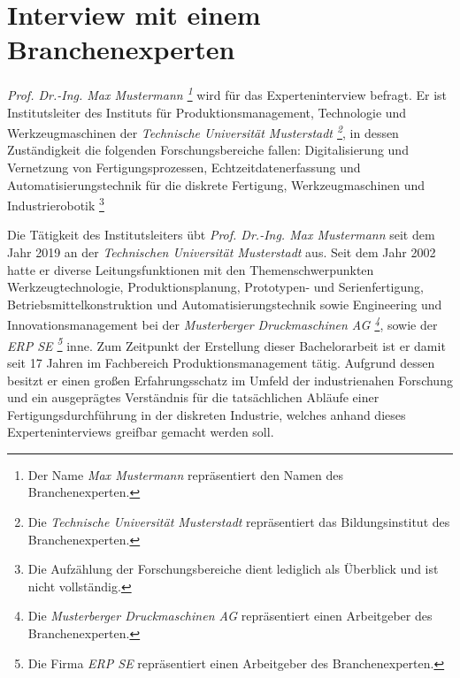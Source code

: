 \tocless\section{Interview mit einem Branchenexperten}\label{ah:interviewTUD}

\textit{Prof. Dr.-Ing. Max Mustermann \footnote{Der Name \textit{Max Mustermann} repräsentiert den Namen des Branchenexperten.}} wird für das Experteninterview befragt.
Er ist Institutsleiter des Instituts für Produktionsmanagement, Technologie und Werkzeugmaschinen der \textit{Technische Universität Musterstadt \footnote{Die \textit{Technische Universität Musterstadt} repräsentiert das Bildungsinstitut des Branchenexperten.}}, in dessen Zuständigkeit die folgenden Forschungsbereiche fallen: Digitalisierung und Vernetzung von Fertigungsprozessen, Echtzeitdatenerfassung und Automatisierungstechnik für die diskrete Fertigung, Werkzeugmaschinen und Industrierobotik \footnote{Die Aufzählung der Forschungsbereiche dient lediglich als Überblick und ist nicht vollständig.}

Die Tätigkeit des Institutsleiters übt \textit{Prof. Dr.-Ing. Max Mustermann} seit dem Jahr 2019 an der \textit{Technischen Universität Musterstadt} aus. Seit dem Jahr 2002 hatte er diverse Leitungsfunktionen mit den Themenschwerpunkten Werkzeugtechnologie, Produktionsplanung, Prototypen- und Serienfertigung, Betriebsmittelkonstruktion und Automatisierungstechnik sowie Engineering und Innovationsmanagement bei der \textit{Musterberger Druckmaschinen AG \footnote{Die \textit{Musterberger Druckmaschinen AG} repräsentiert einen Arbeitgeber des Branchenexperten.}}, sowie der \textit{ERP SE \footnote{Die Firma \textit{ERP SE} repräsentiert einen Arbeitgeber des Branchenexperten.}} inne. Zum Zeitpunkt der Erstellung dieser Bachelorarbeit ist er damit seit 17 Jahren im Fachbereich Produktionsmanagement tätig. Aufgrund dessen besitzt er einen großen Erfahrungsschatz im Umfeld der industrienahen Forschung und ein ausgeprägtes Verständnis für die tatsächlichen Abläufe einer Fertigungsdurchführung in der diskreten Industrie, welches anhand dieses Experteninterviews greifbar gemacht werden soll.


